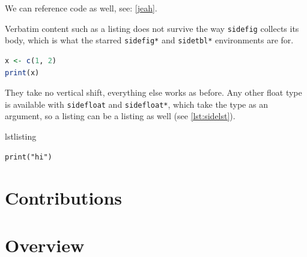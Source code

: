 We can reference code as well, see: \cref{jeah}.

Verbatim content such as a listing does not survive the way \texttt{sidefig} collects its body, which is what the starred \texttt{sidefig*} and \texttt{sidetbl*} environments are for.
\begin{sidefig*}
\begin{lstlisting}[language=R]
x <- c(1, 2)
print(x)
\end{lstlisting}
\caption{A listing within the margin.}
\label{fig:sidelst}
\end{sidefig*}
They take no vertical shift, everything else works as before.
Any other float type is available with \texttt{sidefloat} and \texttt{sidefloat*}, which take the type as an argument, so a listing can be a listing as well (see \cref{lst:sidelst}).
\begin{sidefloat*}{lstlisting}
\begin{verbatim}
print("hi")
\end{verbatim}
\caption{A real listing in the margin.}
\label{lst:sidelst}
\end{sidefloat*}

\section{Contributions}

\section{Overview}